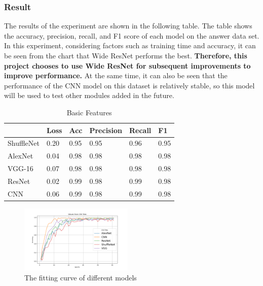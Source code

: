\documentclass[twocolumn]{article}
\begin{document}
        \subsubsection{Result}
        The results of the experiment are shown in the following table. The table shows the accuracy, precision, recall, and F1 score of each model on the answer data set. In this experiment, considering factors such as training time and accuracy, it can be seen from the chart that Wide ResNet performs the best. \textbf{Therefore, this project chooses to use Wide ResNet for subsequent improvements to improve performance.} At the same time, it can also be seen that the performance of the CNN model on this dataset is relatively stable, so this model will be used to test other modules added in the future.

        \begin{table}[h]
            \begin{tabular}{|l|l|l|l|l|l|}
            \hline
                     & Loss & Acc & Precision & Recall & F1  \\ \hline
            ShuffleNet    & 0.20  & 0.95 & 0.95 & 0.96 & 0.95         \\ \hline
            AlexNet     & 0.04 & 0.98 &  0.98 &  0.98 &  0.98      \\ \hline
            VGG-16 & 0.07  & 0.98 & 0.98 & 0.98 &  0.98      \\ \hline
            ResNet    & 0.02  & 0.99 & 0.98 & 0.99  & 0.98         \\ \hline
            CNN      & 0.06   & 0.99  & 0.98  & 0.99  & 0.98        \\ \hline
            \end{tabular}
            \caption{Basic Features}
            \label{tab:basic}
        \end{table}

        \begin{figure}[ht]
            \centering
            \includegraphics[width=0.48\textwidth]{fitting_curve.png}
            \caption{The fitting curve of different models}
            \label{fig:fitting_curve}
        \end{figure}
\end{document}
